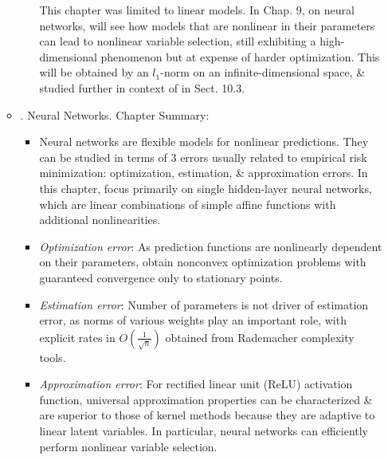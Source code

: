 \documentclass{article}
\begin{document}
\begin{enumerate}
\begin{itemize}
\begin{itemize}
			This chapter was limited to linear models. In Chap. 9, on neural networks, will see how models that are nonlinear in their parameters can lead to nonlinear variable selection, still exhibiting a high-dimensional phenomenon but at expense of harder optimization. This will be obtained by an $l_1$-norm on an infinite-dimensional space, \& studied further in context of  in Sect. 10.3.
		\end{itemize}
		\item {. Neural Networks.} Chapter Summary:
		\begin{itemize}
			\item Neural networks are flexible models for nonlinear predictions. They can be studied in terms of 3 errors usually related to empirical risk minimization: optimization, estimation, \& approximation errors. In this chapter, focus primarily on single hidden-layer neural networks, which are linear combinations of simple affine functions with additional nonlinearities.
			\item {\it Optimization error}: As prediction functions are nonlinearly dependent on their parameters, obtain nonconvex optimization problems with guaranteed convergence only to stationary points.
			\item {\it Estimation error}: Number of parameters is not driver of estimation error, as norms of various weights play an important role, with explicit rates in $O(\frac{1}{\sqrt{n}})$ obtained from Rademacher complexity tools.
			\item {\it Approximation error}: For rectified linear unit (ReLU) activation function, universal approximation properties can be characterized \& are superior to those of kernel methods because they are adaptive to linear latent variables. In particular, neural networks can efficiently perform nonlinear variable selection.
		\end{itemize}
		

\end{itemize}
\end{enumerate}
\end{document}
